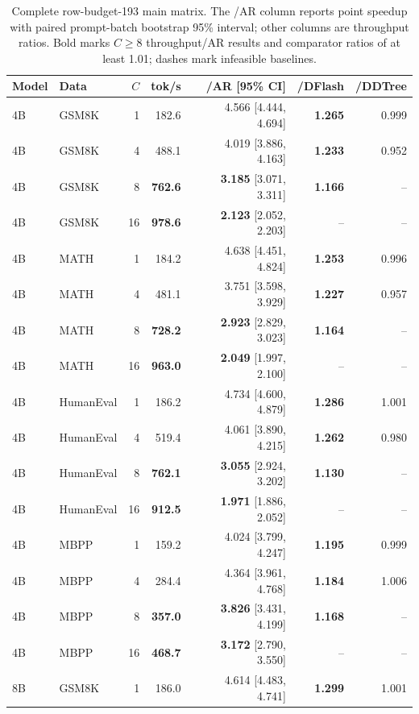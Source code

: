 \documentclass{article}
\begin{document}
\begin{table}[p]
\caption{Complete row-budget-193 main matrix. The /AR column reports point speedup with paired prompt-batch bootstrap 95\% interval; other columns are throughput ratios. Bold marks $C\geq8$ throughput/AR results and comparator ratios of at least 1.01; dashes mark infeasible baselines.}
\label{tab:main-full}
\centering\small
\setlength{\tabcolsep}{3.8pt}
\renewcommand{\arraystretch}{1.08}
\begin{tabular}{@{}llrrrrr@{}}
\toprule
Model & Data & $C$ & tok/s & /AR [95\% CI] & /DFlash & /DDTree\\
\midrule
4B & GSM8K & 1 & 182.6 & 4.566 [4.444, 4.694] & \textbf{1.265} & 0.999\\
4B & GSM8K & 4 & 488.1 & 4.019 [3.886, 4.163] & \textbf{1.233} & 0.952\\
4B & GSM8K & 8 & \textbf{762.6} & \textbf{3.185} [3.071, 3.311] & \textbf{1.166} & --\\
4B & GSM8K & 16 & \textbf{978.6} & \textbf{2.123} [2.052, 2.203] & -- & --\\
4B & MATH & 1 & 184.2 & 4.638 [4.451, 4.824] & \textbf{1.253} & 0.996\\
4B & MATH & 4 & 481.1 & 3.751 [3.598, 3.929] & \textbf{1.227} & 0.957\\
4B & MATH & 8 & \textbf{728.2} & \textbf{2.923} [2.829, 3.023] & \textbf{1.164} & --\\
4B & MATH & 16 & \textbf{963.0} & \textbf{2.049} [1.997, 2.100] & -- & --\\
4B & HumanEval & 1 & 186.2 & 4.734 [4.600, 4.879] & \textbf{1.286} & 1.001\\
4B & HumanEval & 4 & 519.4 & 4.061 [3.890, 4.215] & \textbf{1.262} & 0.980\\
4B & HumanEval & 8 & \textbf{762.1} & \textbf{3.055} [2.924, 3.202] & \textbf{1.130} & --\\
4B & HumanEval & 16 & \textbf{912.5} & \textbf{1.971} [1.886, 2.052] & -- & --\\
4B & MBPP & 1 & 159.2 & 4.024 [3.799, 4.247] & \textbf{1.195} & 0.999\\
4B & MBPP & 4 & 284.4 & 4.364 [3.961, 4.768] & \textbf{1.184} & 1.006\\
4B & MBPP & 8 & \textbf{357.0} & \textbf{3.826} [3.431, 4.199] & \textbf{1.168} & --\\
4B & MBPP & 16 & \textbf{468.7} & \textbf{3.172} [2.790, 3.550] & -- & --\\
8B & GSM8K & 1 & 186.0 & 4.614 [4.483, 4.741] & \textbf{1.299} & 1.001\\

\end{tabular}
\end{table}
\end{document}
